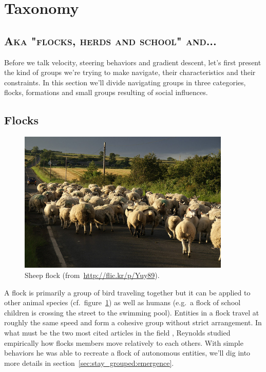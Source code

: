 \documentclass[a4paper,titlepage]{article}
\newcommand{\sectionsubtitle}[1]{{\subsection*{\scshape #1}}}
\begin{document}
\section{Taxonomy}
\label{sec:taxonomy}
\sectionsubtitle{Aka "flocks, herds and school" and...}

Before we talk velocity, steering behaviors and gradient descent, let’s first present the kind of groups we’re trying to make navigate, their characteristics and their constraints. In this section we’ll divide navigating groups in three categories, flocks, formations and small groups resulting of social influences.

\subsection{Flocks}
\label{sec:taxonomy:flocks}

\begin{figure}[h]
\centering
\includegraphics[width=0.9\textwidth]{SheepsHerd.jpg}
\caption{Sheep flock (from~\url{http://flic.kr/p/Yuy89}).}
\label{fig:sheep_flock}
\end{figure}

A flock is primarily a group of bird traveling together but it can be applied to other animal species (cf.\ figure~\ref{fig:sheep_flock}) as well as humans (e.g.\ a flock of school children is crossing the street to the swimming pool). Entities in a flock travel at roughly the same speed and form a cohesive group without strict arrangement. In what must be the two most cited articles in the field \cite{Reynolds:1987vm,Reynolds:1999vr}, Reynolds studied empirically how flocks members move relatively to each others. With simple behaviors he was able to recreate a flock of autonomous entities, we’ll dig into more details in section~\ref{sec:stay_grouped:emergence}.
\end{document}
